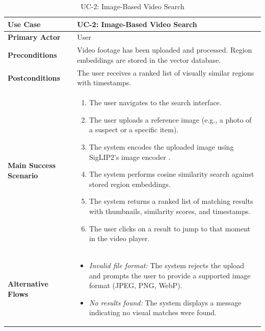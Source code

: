 \begin{table}[H]
\centering
\begin{tabular}{|l|p{10cm}|}
\hline
\textbf{Use Case}       & UC-2: Image-Based Video Search \\ \hline
\textbf{Primary Actor}   & User \\ \hline
\textbf{Preconditions}   & Video footage has been uploaded and processed. Region embeddings are stored in the vector database. \\ \hline
\textbf{Postconditions}  & The user receives a ranked list of visually similar regions with timestamps. \\ \hline
\textbf{Main Success Scenario} &
    \begin{enumerate}[nosep, leftmargin=*]
        \item The user navigates to the search interface.
        \item The user uploads a reference image (e.g., a photo of a suspect or a specific item).
        \item The system encodes the uploaded image using SigLIP2's image encoder \cite{zhai2025siglip2}.
        \item The system performs cosine similarity search against stored region embeddings.
        \item The system returns a ranked list of matching results with thumbnails, similarity scores, and timestamps.
        \item The user clicks on a result to jump to that moment in the video player.
    \end{enumerate} \\ \hline
\textbf{Alternative Flows} &
    \begin{itemize}[nosep, leftmargin=*]
        \item \textit{Invalid file format:} The system rejects the upload and prompts the user to provide a supported image format (JPEG, PNG, WebP).
        \item \textit{No results found:} The system displays a message indicating no visual matches were found.
    \end{itemize} \\ \hline
\end{tabular}
\caption{UC-2: Image-Based Video Search}
\label{tab:uc2}
\end{table}

